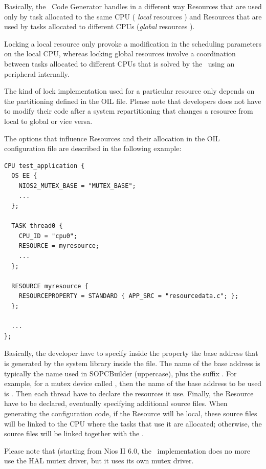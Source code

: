 Basically, the \rtd\ Code Generator handles in a different way
Resources that are used only by task allocated to the same CPU ({\em
local} resources ) and Resources that are used
by tasks allocated to different CPUs ({\em global} resources
). 

Locking a local resource only provoke a modification in the scheduling
parameters on the local CPU, whereas locking global resources involve
a coordination between tasks allocated to different CPUs that is
solved by the \ee\ using an  peripheral
internally.

The kind of lock implementation used for a particular resource only
depends on the partitioning defined in the OIL file.  Please note that
developers does not have to modify their code after a system
repartitioning that changes a resource from local to global or vice versa.

The options that influence Resources and their allocation in the OIL
configuration file are described in the following example:

\begin{lstlisting}
CPU test_application {
  OS EE {
    NIOS2_MUTEX_BASE = "MUTEX_BASE";
    ...
  };

  TASK thread0 {
    CPU_ID = "cpu0";
    RESOURCE = myresource;
    ...
  };

  RESOURCE myresource {
    RESOURCEPROPERTY = STANDARD { APP_SRC = "resourcedata.c"; };
  };

  ...
};
\end{lstlisting}

Basically, the developer have to specify inside the property
 the base address that
is generated by the system library inside the 
file. The name of the base address is typically the name used in
SOPCBuilder (uppercase), plus the suffix . For example,
for a mutex device called , then the name of the base
address to be used is . Then each thread have to
declare the resources it use. Finally, the Resource have to be
declared, eventually specifying additional source files. When
generating the configuration code, if the Resource will be local,
these source files will be linked to the CPU where the tasks that use
it are allocated; otherwise, the source files will be linked together
with the .

Please note that (starting from Nios II 6.0, the \ee\ implementation
does no more use the HAL mutex driver, but it uses its own mutex
driver.





